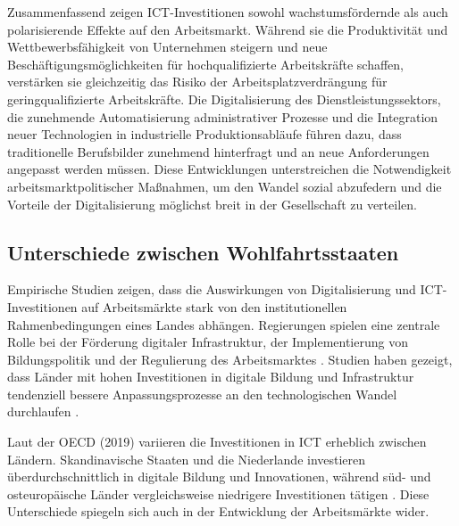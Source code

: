Zusammenfassend zeigen \ac{ICT}-Investitionen sowohl wachstumsfördernde als auch 
polarisierende Effekte auf den Arbeitsmarkt. Während sie die Produktivität und 
Wettbewerbsfähigkeit von Unternehmen steigern und neue Beschäftigungsmöglichkeiten für 
hochqualifizierte Arbeitskräfte schaffen, verstärken sie gleichzeitig das Risiko der 
Arbeitsplatzverdrängung für geringqualifizierte Arbeitskräfte. Die Digitalisierung des 
Dienstleistungssektors, die zunehmende Automatisierung administrativer Prozesse und die 
Integration neuer Technologien in industrielle Produktionsabläufe führen dazu, dass 
traditionelle Berufsbilder zunehmend hinterfragt und an neue Anforderungen angepasst 
werden müssen. Diese Entwicklungen unterstreichen die Notwendigkeit 
arbeitsmarktpolitischer Maßnahmen, um den Wandel sozial abzufedern und die Vorteile der 
Digitalisierung möglichst breit in der Gesellschaft zu verteilen.



\subsection{Unterschiede zwischen Wohlfahrtsstaaten}

Empirische Studien zeigen, dass die Auswirkungen von Digitalisierung und 
\ac{ICT}-Investitionen auf Arbeitsmärkte stark von den institutionellen Rahmenbedingungen 
eines Landes abhängen. Regierungen spielen eine zentrale Rolle bei der Förderung 
digitaler Infrastruktur, der Implementierung von Bildungspolitik und der Regulierung des 
Arbeitsmarktes \parencite[vgl.][S. 1–5]{hall2001varieties}. Studien haben gezeigt, dass 
Länder mit hohen Investitionen in digitale Bildung und Infrastruktur tendenziell bessere 
Anpassungsprozesse an den technologischen Wandel durchlaufen 
\parencite[vgl.][S. 23]{oecd2020digital}.

Laut der \ac{OECD} (2019) variieren die Investitionen in \ac{ICT} erheblich zwischen 
Ländern. Skandinavische Staaten und die Niederlande investieren überdurchschnittlich in 
digitale Bildung und Innovationen, während süd- und osteuropäische Länder vergleichsweise 
niedrigere Investitionen tätigen \parencite[vgl.][S. 45]{oecd2020digital}. Diese 
Unterschiede spiegeln sich auch in der Entwicklung der Arbeitsmärkte wider.

